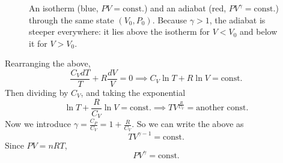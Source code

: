 \documentclass{report}
\numberwithin{equation}{section}
\begin{document}
\begin{figure}[H]
\centering
{}
\caption{An isotherm (blue, $PV=\text{const.}$) and an adiabat (red, $PV^\gamma=\text{const.}$) through the same state $(V_0,P_0)$. Because $\gamma>1$, the adiabat is steeper everywhere: it lies above the isotherm for $V<V_0$ and below it for $V>V_0$.}
\label{fig:isotherm_vs_adiabat}
\end{figure}
Rearranging the above,
\begin{equation*}
    \frac{C_VdT}{T} + R\frac{dV}{V} =0 \implies C_V\ln T + R\ln V = \text{const.}
\end{equation*}
Then dividing by $C_V$, and taking the exponential
\begin{equation*}
    \ln T + \frac{R}{C_V}\ln V = \text{const.} \implies TV^{\frac{R}{C_V}} = \text{another const.}
\end{equation*}
Now we introduce $\gamma = \frac{C_P}{C_V} = 1 + \frac{R}{C_V}$. So we can write the above as 
\begin{equation}
    TV^{\gamma - 1} = \text{const.}
\end{equation}
Since $PV = nRT$, 
\begin{equation}
    PV^{\gamma} = \text{const.}
\end{equation}
\end{document}
